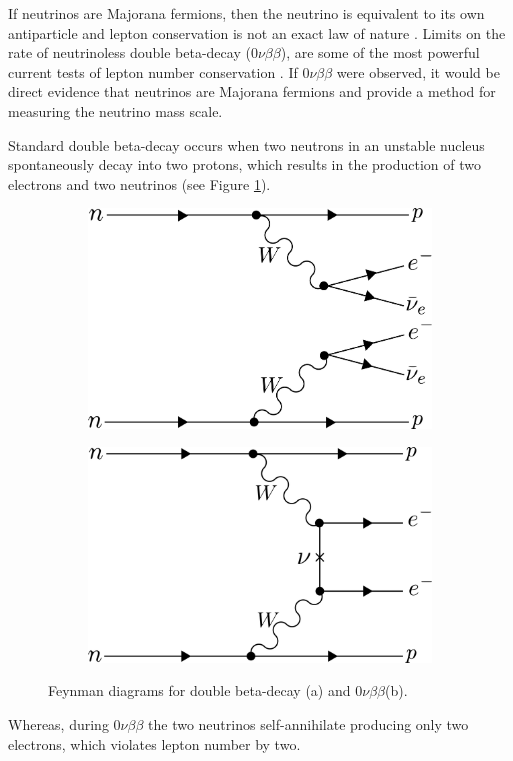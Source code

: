 If neutrinos are Majorana fermions, then the neutrino is equivalent to its own antiparticle and lepton conservation is not an exact law of nature \cite{double_beta1}. Limits on the rate of neutrinoless double beta-decay ($0\nu\beta\beta$), are some of the most powerful current tests of lepton number conservation \cite{Workman:2022ynf}. If $0\nu\beta\beta$ were observed, it would be direct evidence that neutrinos are Majorana fermions and provide a method for measuring the neutrino mass scale.

Standard double beta-decay occurs when two neutrons in an unstable nucleus spontaneously decay into two protons, which results in the production of two electrons and two neutrinos (see Figure \ref{fig:chap2-0nubetabeta-diagram}).  
\begin{figure}[htbp]
    \centering
    \begin{subfigure}{0.4\textwidth}
        \includegraphics*[width=\textwidth]{figs/Chapter-2/230717_2nubetabeta.png}
        \caption{}
    \end{subfigure}
    \begin{subfigure}{0.4\textwidth}
        \includegraphics*[width=\textwidth]{figs/Chapter-2/230717_0nubetabeta.png}
        \caption{}
    \end{subfigure}
    \caption{\label{fig:chap2-0nubetabeta-diagram} Feynman diagrams for double beta-decay (a) and $0\nu\beta\beta$(b).}
\end{figure}
Whereas, during $0\nu\beta\beta$ the two neutrinos self-annihilate producing only two electrons, which violates lepton number by two. 

